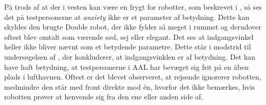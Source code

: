 %
På trods af at der i vesten kan være en frygt for robotter, som beskrevet i , så ses det på testpersonerne at \textit{anxiety} ikke er et parameter af betydning. Dette kan skyldes den brugte Double robot, der ikke fylder så meget i rummet og derudover oftest blev omtalt som værende sød, sej eller elegant. \blankline
%
Det ses at indgangsvinkel heller ikke bliver nævnt som et betydende parametre. Dette står i modstrid til undersøgelsen af \textcite{PDF:HowMayIServeYou}, der konkluderer, at indgangsvinklen er af betydning. Det kan have haft betydning, at testpersonerne i AAL har bevæget sig frit på en åben plads i lufthavnen. Oftest er det blevet observeret, at rejsende ignorerer robotten, medmindre den står med front direkte mod én, hvorfor det ikke bemærkes, hvis robotten prøver at henvende sig fra den ene eller anden side af. 

%






